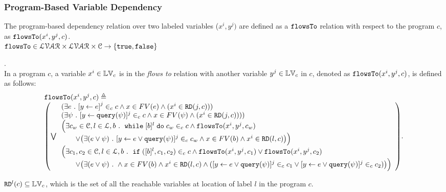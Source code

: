 \subsubsection{Program-Based Variable Dependency}
The program-based dependency relation over two labeled variables ($x^i, y^j)$ are defined as a $\mathtt{flowsTo}$ relation with respect to the program $c$, as $\mathtt{flowsTo}(x^i, y^j, c)$.
\\
$\mathtt{flowsTo} \in \mathcal{LVAR} \times \mathcal{LVAR} \times \mathcal{C} \to \{\mathtt{true}, \mathtt{false}\}$
%
\begin{defn}.
\label{def:flowsto}
\\
In a program  ${c}$,
a variable ${x^i}  \in \mathbb{LV}_c $ is in the \emph{flows to} relation with another variable ${y^j} \in \mathbb{LV}_c$
in ${c}$, denoted as $\mathtt{flowsTo}({x^i, y^j, c})$, is defined as follows:
%
{\footnotesize 
\[
\begin{array}{l}
\flowsto({x^i, y^j, c}) \triangleq 
\\
\left( \bigvee
\begin{array}{l}
(\exists \expr \st \clabel{\assign{y}{\expr}}^j \in_{c} {c} 
\land {x} \in FV(\expr) \land (x^i \in \live(j, c)))
\\
(\exists {\qexpr} \st [\assign{y}{\query({\qexpr})}]^j \in_{c} {c} 
\land x \in FV({\qexpr}) \land (x^i \in \live(j,c))))
\\
\Big(\exists {c_w} \in \cdom, l \in \mathcal{L}, \bexpr \st
	\ewhile [\bexpr]^l \edo {c_w} \in_{c} {c}
	\land \flowsto(x^i, y^j, c_w)
	\\ \qquad	
     \lor 
	\big( \exists {(\expr \lor \qexpr)} \st
	[{\assign{y}{\expr \lor \query(\qexpr)}}]^{j} \in_{c}  {c_w}  \land {x} \in FV(\bexpr) \land x^i \in \live(l, c)
	\big)
	\Big)
\\
\Big(
\exists {c_1}, {c_2} \in \cdom, l \in \mathcal{L}, \bexpr 
\st 
	\eif([\bexpr]^l, {c_1}, {c_2}) \in_{c} {c} \land
	\flowsto(x^i, y^j, c_1) \lor \flowsto(x^i, y^j, c_2)
	\\ \qquad 
	\lor 
	\big( \exists {(\expr \lor \qexpr)} \st
	\land {x} \in FV(\bexpr) \land x^i \in \live(l, c) \land
	([{\assign{y}{\expr \lor \query(\qexpr)}}]^{j} \in_{c}  {c_1}  
	\lor [{\assign{y}{\expr \lor \query(\qexpr)}}]^{j} \in_{c}  {c_2})
	\big)
\Big)
\end{array}
\right).
\end{array}
\]
}
%
\end{defn}
%
$\mathtt{RD}^l(c) \subseteq \mathbb{LV}_c$,
which is the set of all the reachable variables at location of label $l$ in the program $c$.
